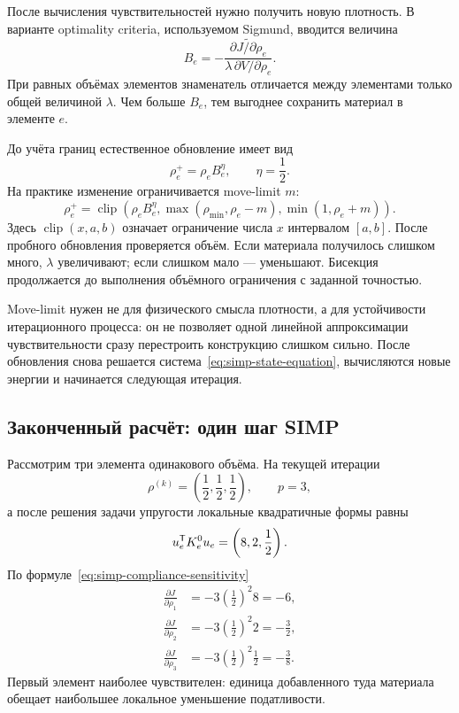 После вычисления чувствительностей нужно получить новую плотность. В варианте optimality criteria, используемом Sigmund, вводится величина
\begin{equation}
\label{eq:simp-oc-ratio}
 B_e
 =
 -
 \frac{
  \widetilde{\partial J/\partial\rho_e}
 }{
  \lambda\,\partial V/\partial\rho_e
 }.
\end{equation}
При равных объёмах элементов знаменатель отличается между элементами только общей величиной $\lambda$. Чем больше $B_e$, тем выгоднее сохранить материал в элементе $e$.

До учёта границ естественное обновление имеет вид
\begin{equation}
\label{eq:simp-oc-unclipped}
 \rho_e^+
 =
 \rho_e B_e^{\eta},
 \qquad
 \eta=\frac12.
\end{equation}
На практике изменение ограничивается move-limit $m$:
\begin{equation}
 \rho_e^+
 =
 \operatorname{clip}
 \left(
  \rho_e B_e^{\eta},
  \max(\rho_{\min},\rho_e-m),
  \min(1,\rho_e+m)
 \right).
\end{equation}
Здесь $\operatorname{clip}(x,a,b)$ означает ограничение числа $x$ интервалом $[a,b]$. После пробного обновления проверяется объём. Если материала получилось слишком много, $\lambda$ увеличивают; если слишком мало --- уменьшают. Бисекция продолжается до выполнения объёмного ограничения с заданной точностью.

Move-limit нужен не для физического смысла плотности, а для устойчивости итерационного процесса: он не позволяет одной линейной аппроксимации чувствительности сразу перестроить конструкцию слишком сильно. После обновления снова решается система~\eqref{eq:simp-state-equation}, вычисляются новые энергии и начинается следующая итерация.

\subsection{Законченный расчёт: один шаг SIMP}

Рассмотрим три элемента одинакового объёма. На текущей итерации
\begin{equation}
 \rho^{(k)}
 =
 \left(\frac12,\frac12,\frac12\right),
 \qquad
 p=3,
\end{equation}
а после решения задачи упругости локальные квадратичные формы равны
\begin{equation}
\label{eq:simp-example-energies}
 u_e^{\mathsf{T}}K_e^0u_e
 =
 \left(8,2,\frac12\right).
\end{equation}
По формуле~\eqref{eq:simp-compliance-sensitivity}
\begin{equation}
 \begin{aligned}
 \frac{\partial J}{\partial\rho_1}
 &=-3\left(\frac12\right)^2 8=-6,\\
 \frac{\partial J}{\partial\rho_2}
 &=-3\left(\frac12\right)^2 2=-\frac32,\\
 \frac{\partial J}{\partial\rho_3}
 &=-3\left(\frac12\right)^2\frac12=-\frac38.
 \end{aligned}
\end{equation}
Первый элемент наиболее чувствителен: единица добавленного туда материала обещает наибольшее локальное уменьшение податливости.

